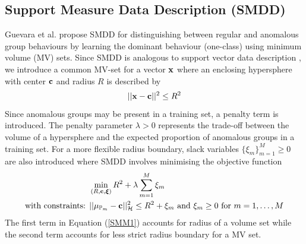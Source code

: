   
\subsection{ Support Measure Data Description (SMDD) } 
 Guevara et al. \cite{SMDD} propose SMDD for  distinguishing between regular and anomalous  group behaviours by learning the dominant behaviour (one-class)   using minimum volume (MV) sets. {  Since SMDD is  analogous to support  vector data description \cite{SVDD}, we introduce a common MV-set for a vector ${\bf x}$ where an enclosing hypersphere with center $\bf c$ and radius $R$ is described by } 
\[ ||{\bf x}  -{\bf c}||^2 \le R^2 \]
 Since anomalous groups may be present in a training set, a penalty term is introduced. The penalty parameter $\lambda >0$ represents the trade-off between the volume of a  hypersphere and 
 the expected proportion of anomalous groups in a training set. 
 For a more flexible radius boundary, slack variables $\big\{\xi_m \big\}_{m=1}^M \ge 0$ are also introduced where SMDD %
 involves minimising the objective function 
 \begin{align}
 &\min_{(R,{\bf c}, \boldsymbol\xi) }   R^2+\lambda \sum_{m=1}^M \xi_m \label{SMM1}  \\
\mbox{with constraints: } &||\mu_{\mathbb{P}_m}  -{\bf c}||^2 _\mathcal{H}\le R^2  +\xi_m  \mbox{ and } \xi_m  \ge 0 \mbox{ for } m=1,\dots,M  \nonumber
\end{align}
 The first term in Equation (\ref{SMM1}) accounts for radius of a volume set while the second term accounts for less strict radius boundary for a MV set. 
 
